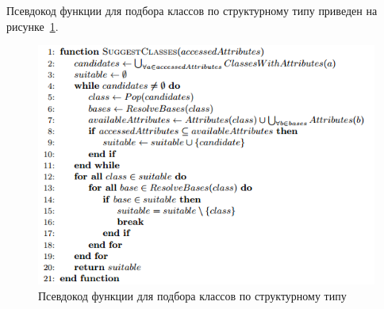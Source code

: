 Псевдокод функции для подбора классов по структурному типу приведен на
рисунке~\ref{fig:pseudocode}. 


\begin{figure}
\begin{center}
    \includegraphics[width=\textwidth]{fig/pseudocode.png}
\end{center}
\caption{Псевдокод функции для подбора классов по структурному типу}
\label{fig:pseudocode}
\end{figure}


